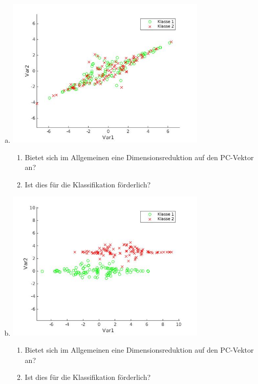 \documentclass[a4paper]{scrartcl}
\begin{document}
\begin{enumerate}[(a)]
	\item \hfill
	
	\includegraphics[width=0.75\textwidth]{data/img1.jpg}
		
	\begin{enumerate}
		\item Bietet sich im Allgemeinen eine Dimensionsreduktion auf den PC-Vektor an?
		
		\item Ist dies für die Klassifikation förderlich?
		
	\end{enumerate}
	
	\item \hfill
	
	\includegraphics[width=0.75\textwidth]{data/img2.jpg}
	
	\begin{enumerate}
		\item Bietet sich im Allgemeinen eine Dimensionsreduktion auf den PC-Vektor an?
		
		\item Ist dies für die Klassifikation förderlich?
		

\end{enumerate}
\end{enumerate}
\end{document}
